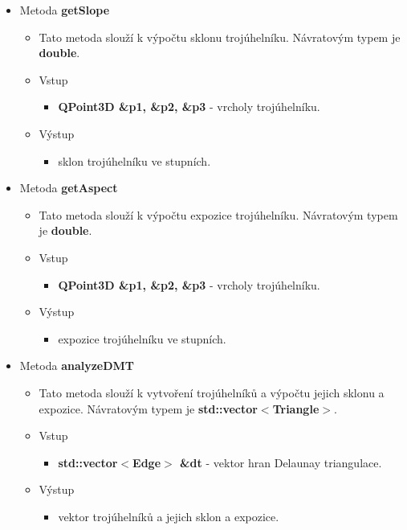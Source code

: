 \documentclass[a4paper, 12pt]{article}
\begin{document}
\begin{itemize}
	\item Metoda \textbf{getSlope}		
\begin{itemize}
	\item Tato metoda slouží k výpočtu sklonu trojúhelníku. Návratovým typem je \textbf{double}.
	\item Vstup
	\begin{itemize}
		\item \textbf{QPoint3D \&p1, \&p2, \&p3} - vrcholy trojúhelníku.
	\end{itemize}
	\item Výstup
	\begin{itemize}	
		\item sklon trojúhelníku ve stupních.
	\end{itemize}
\end{itemize}

	\item Metoda \textbf{getAspect}		
\begin{itemize}
	\item Tato metoda slouží k výpočtu expozice trojúhelníku. Návratovým typem je \textbf{double}.
	\item Vstup
	\begin{itemize}
		\item \textbf{QPoint3D \&p1, \&p2, \&p3} - vrcholy trojúhelníku.
	\end{itemize}
	\item Výstup
	\begin{itemize}	
		\item expozice trojúhelníku ve stupních.
	\end{itemize}
\end{itemize}

	\item Metoda \textbf{analyzeDMT}		
\begin{itemize}
	\item Tato metoda slouží k vytvoření trojúhelníků a výpočtu jejich sklonu a expozice. Návratovým typem je \textbf{std::vector$<$Triangle$>$}.
	\item Vstup
	\begin{itemize}
		\item \textbf{std::vector$<$Edge$>$ \&dt} - vektor hran Delaunay triangulace.
	\end{itemize}
	\item Výstup
	\begin{itemize}	
		\item vektor trojúhelníků a jejich sklon a expozice.
	\end{itemize}
\end{itemize}


\end{itemize}
\end{document}
